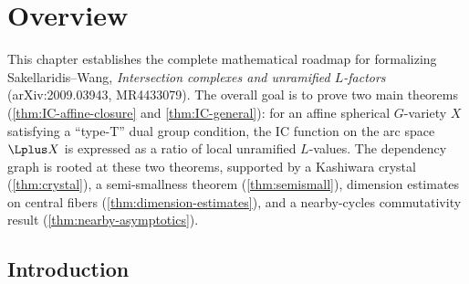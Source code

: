 \chapter{Overview}
\label{chap:overview}


This chapter establishes the complete mathematical roadmap for formalizing
Sakellaridis--Wang, \textit{Intersection complexes and unramified $L$-factors}
(arXiv:2009.03943, MR4433079).
The overall goal is to prove two main theorems
(\cref{thm:IC-affine-closure} and \cref{thm:IC-general}):
for an affine spherical \( G \)-variety \( X \) satisfying a ``type-T'' dual group condition,
the IC function on the arc space \( \Lplus X \) is expressed as a ratio of local
unramified \( L \)-values.  The dependency graph is rooted at these two theorems,
supported by a Kashiwara crystal (\cref{thm:crystal}), a semi-smallness theorem
(\cref{thm:semismall}), dimension estimates on central fibers
(\cref{thm:dimension-estimates}), and a nearby-cycles commutativity result
(\cref{thm:nearby-asymptotics}).


\section{Introduction}


